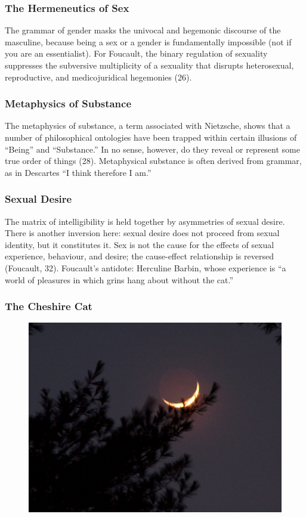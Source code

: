 \documentclass[xcolor=dvipsnames]{beamer}
\begin{document}
\begin{frame}
  \frametitle{The Hermeneutics of Sex}
  The grammar of gender masks the univocal and hegemonic discourse of
  the masculine, because being a sex or a gender is fundamentally
  impossible (not if you are an essentialist). For Foucault, the
  binary regulation of sexuality suppresses the subversive
  multiplicity of a sexuality that disrupts heterosexual,
  reproductive, and medicojuridical hegemonies (26).
\end{frame}

\begin{frame}
  \frametitle{Metaphysics of Substance}
The metaphysics of substance, a term associated with Nietzsche, shows
that a number of philosophical ontologies have been trapped within
certain illusions of ``Being'' and ``Substance.'' In no sense,
however, do they reveal or represent some true order of things (28).
Metaphysical substance is often derived from grammar, as in Descartes
``I think therefore I am.''  
\end{frame}

\begin{frame}
  \frametitle{Sexual Desire}
  The matrix of intelligibility is held together by asymmetries of
  sexual desire. There is another inversion here: sexual desire does
  not proceed from sexual identity, but it constitutes it. Sex is not
  the cause for the effects of sexual experience, behaviour, and
  desire; the cause-effect relationship is reversed (Foucault, 32).
  Foucault's antidote: Herculine Barbin, whose experience is ``a world
  of pleasures in which grins hang about without the cat.''
\end{frame}

\begin{frame}
  \frametitle{The Cheshire Cat}
  \begin{figure}[h]
    \includegraphics[scale=0.45]{./cheshire.jpg}
  \end{figure}
\end{frame}
\end{document}
